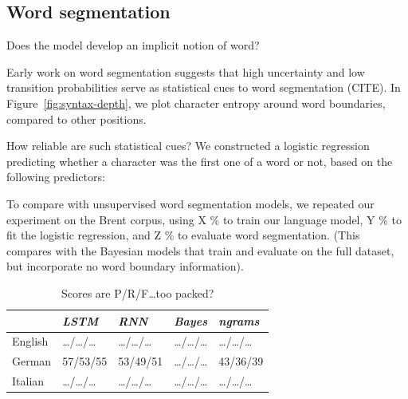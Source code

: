 \subsection{Word segmentation}
\label{sec:segmentation}



Does the model develop an implicit notion of word?

Early work on word segmentation suggests that high uncertainty and low transition probabilities serve as statistical cues to word segmentation (CITE).
In Figure~\ref{fig:syntax-depth}, we plot character entropy around word boundaries, compared to other positions.

How reliable are such statistical cues?
We constructed a logistic regression predicting whether a character was the first one of a word or not, based on the following predictors:


To compare with unsupervised word segmentation models, we repeated our experiment on the Brent corpus, using X \% to train our language model, Y \% to fit the logistic regression, and Z \% to evaluate word segmentation.
(This compares with the Bayesian models that train and evaluate on the full dataset, but incorporate no word boundary information).




%
%
%
%


\begin{table}[t]
  \begin{center}
    \begin{tabular}{l|l|l|l|l}
      \multicolumn{1}{c}{}&\emph{LSTM}&\emph{RNN}&\emph{Bayes}&\emph{ngrams}\\
      \hline
      English &\ldots{}/\ldots{}/\ldots & \ldots{}/\ldots{}/\ldots & \ldots{}/\ldots{}/\ldots &\ldots{}/\ldots{}/\ldots\\
      German & 57/53/55 & 53/49/51 & \ldots{}/\ldots{}/\ldots & 43/36/39 \\
      Italian &\ldots{}/\ldots{}/\ldots & \ldots{}/\ldots{}/\ldots & \ldots{}/\ldots{}/\ldots &\ldots{}/\ldots{}/\ldots\\
    \end{tabular}
  \end{center}
  \caption{\label{tab:segmentation-results} Scores are P/R/F\ldots too packed?}
\end{table}



